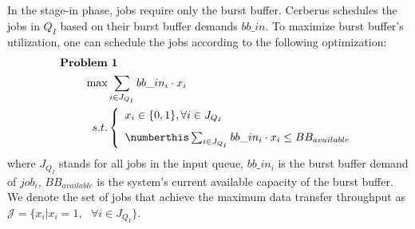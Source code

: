 In the stage-in phase, jobs require only the burst buffer.
Cerberus schedules the jobs in $Q_I$ based on their burst buffer demands $bb\_in$.
To maximize burst buffer's utilization, one can schedule the jobs according to the following optimization:
\begin{align*}
        \mathbf{Problem} & \text{ } \mathbf{1} \\
        \max &\sum_{i\in J_{Q_I}} bb\_in_i \cdot x_i \\
        s.t. &\left\{
                \begin{array}{l}
                        x_i \in \{0, 1\}, \forall i \in J_{Q_I}\\ [0.8em] \numberthis \label{Equ:MaxTransferData}
                        \sum_{i \in J_{Q_I}} bb\_in_i \cdot x_i \leq BB_{available}
                \end{array}
        \right.
\end{align*}
where $J_{Q_I}$ stands for all jobs in the input queue,
$bb\_in_i$ is the burst buffer demand of $job_i$,
$BB_{available}$ is the system's current available capacity of the burst buffer.
We denote the set of jobs that achieve the maximum data transfer throughput as
$\mathcal{J} = \{x_i|x_i = 1, \text{ } \forall i \in J_{Q_I}\}$.


